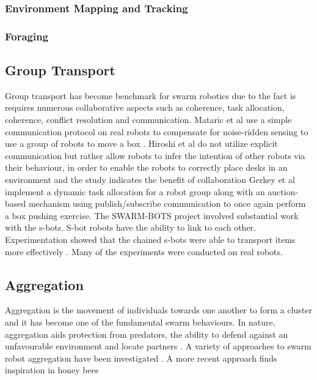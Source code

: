\subsubsection{Environment Mapping and Tracking}



\subsubsection{Foraging}
\subsection{Group Transport}

Group transport has become benchmark for swarm robotics due to the fact is requires numerous collaborative aspects such as coherence, task allocation, coherence, conflict resolution and communication. Mataric et al use a simple communication protocol on real robots to compensate for noise-ridden sensing to use a group of robots to move a box \cite{mataric1995cooperative}. Hiroshi et al do not utilize explicit communication but rather allow robots to infer the intention of other robots via their behaviour, in order to enable the robots to correctly place desks in an environment and the study indicates the benefit of collaboration \cite{sugie1995placing}
Gerkey et al implement a dynamic task allocation for a robot group along with an auction-based mechanism using publish/subscribe communication to once again perform a box pushing exercise. \cite{gerkey2002sold}
The SWARM-BOTS project involved substantial work with the s-bots. S-bot robots have the ability to link to each other. Experimentation showed that the chained s-bots were able to transport items more effectively \cite{gross2004group, dorigo2005swarm}. Many of the experiments were conducted on real robots. 

\subsection{Aggregation}
Aggregation is the movement of individuals towards one another to form a cluster and it has become one of the fundamental swarm behaviours. In nature, aggregation aids protection from predators, the ability to defend against an unfavourable environment and locate partners \cite{bonabeau2001self}. A variety of approaches to swarm robot aggregation have been investigated \cite{yan2011algorithm, soysal2007aggregation, trianni2003evolving, dimarogonas2008connectedness }. A more recent approach finds inspiration in honey bees \cite{schmickl2011beeclust, schmickl2009two}


